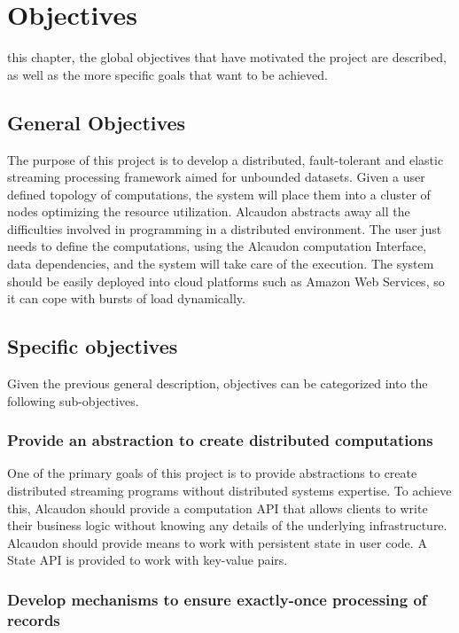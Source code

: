 \chapter{Objectives}
\label{chap:objectives}

 this chapter, the global objectives that have motivated the project
are described, as well as the more specific goals that want to be achieved.

\section{General Objectives}

The purpose of this project is to develop a distributed, fault-tolerant and
elastic streaming processing framework aimed for unbounded datasets. Given a
user defined topology of computations, the system will place them into a cluster
of nodes optimizing the resource utilization. Alcaudon abstracts away all the
difficulties involved in programming in a distributed environment. The user just
needs to define the computations, using the Alcaudon computation Interface, data
dependencies, and the system will take care of the execution. The system should be
easily deployed into cloud platforms such as Amazon Web Services, so it can cope
with bursts of load dynamically.

\section{Specific objectives}

Given the previous general description, objectives can be categorized into the
following sub-objectives.

\subsection{Provide an abstraction to create distributed computations}
One of the primary goals of this project is to provide abstractions to create
distributed streaming programs without distributed systems expertise. To achieve
this, Alcaudon should provide a computation API that allows clients to write
their business logic without knowing any details of the underlying
infrastructure.
Alcaudon should provide means to work with persistent state in user code. A
State API is provided to work with key-value pairs.

\subsection{Develop mechanisms to ensure exactly-once processing of records}

